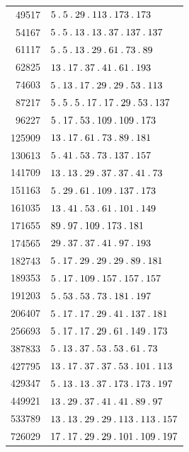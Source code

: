 %
\begingroup\small\setlength{\tabcolsep}{5pt}
\begin{longtable}{@{}r|l@{}}
49517 & $5\pdot 5\pdot 29\pdot 113\pdot 173\pdot 173$\\
54167 & $5\pdot 5\pdot 13\pdot 13\pdot 37\pdot 137\pdot 137$\\
61117 & $5\pdot 5\pdot 13\pdot 29\pdot 61\pdot 73\pdot 89$\\
62825 & $13\pdot 17\pdot 37\pdot 41\pdot 61\pdot 193$\\
74603 & $5\pdot 13\pdot 17\pdot 29\pdot 29\pdot 53\pdot 113$\\
87217 & $5\pdot 5\pdot 5\pdot 17\pdot 17\pdot 29\pdot 53\pdot 137$\\
96227 & $5\pdot 17\pdot 53\pdot 109\pdot 109\pdot 173$\\
125909 & $13\pdot 17\pdot 61\pdot 73\pdot 89\pdot 181$\\
130613 & $5\pdot 41\pdot 53\pdot 73\pdot 137\pdot 157$\\
141709 & $13\pdot 13\pdot 29\pdot 37\pdot 37\pdot 41\pdot 73$\\
151163 & $5\pdot 29\pdot 61\pdot 109\pdot 137\pdot 173$\\
161035 & $13\pdot 41\pdot 53\pdot 61\pdot 101\pdot 149$\\
171655 & $89\pdot 97\pdot 109\pdot 173\pdot 181$\\
174565 & $29\pdot 37\pdot 37\pdot 41\pdot 97\pdot 193$\\
182743 & $5\pdot 17\pdot 29\pdot 29\pdot 29\pdot 89\pdot 181$\\
189353 & $5\pdot 17\pdot 109\pdot 157\pdot 157\pdot 157$\\
191203 & $5\pdot 53\pdot 53\pdot 73\pdot 181\pdot 197$\\
206407 & $5\pdot 17\pdot 17\pdot 29\pdot 41\pdot 137\pdot 181$\\
256693 & $5\pdot 17\pdot 17\pdot 29\pdot 61\pdot 149\pdot 173$\\
387833 & $5\pdot 13\pdot 37\pdot 53\pdot 53\pdot 61\pdot 73$\\
427795 & $13\pdot 17\pdot 37\pdot 37\pdot 53\pdot 101\pdot 113$\\
429347 & $5\pdot 13\pdot 13\pdot 37\pdot 173\pdot 173\pdot 197$\\
449921 & $13\pdot 29\pdot 37\pdot 41\pdot 41\pdot 89\pdot 97$\\
533789 & $13\pdot 13\pdot 29\pdot 29\pdot 113\pdot 113\pdot 157$\\
726029 & $17\pdot 17\pdot 29\pdot 29\pdot 101\pdot 109\pdot 197$\\

\end{longtable}
